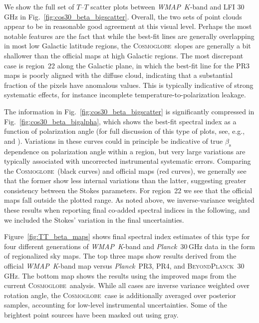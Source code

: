 \documentclass[twocolumn]{../../common/aa}
\def\WMAP{\emph{WMAP}}
\def\Planck{\emph{Planck}}
\newcommand{\bp}{\textsc{BeyondPlanck}}
\newcommand{\cosmoglobe}{\textsc{Cosmoglobe}}
\newcommand{\K}[0]{\textit K}
\begin{document}
We show the full set of $T$--$T$ scatter plots between \WMAP\ $K$-band and LFI 30\,GHz in Fig.~\ref{fig:cos30_beta_bigscatter}. Overall, the two sets of point clouds appear to be in reasonable good agreement at this visual level. Perhaps the most notable features are the fact that while the best-fit lines are generally overlapping in most low Galactic latitude regions, the \cosmoglobe\ slopes are generally a bit shallower than the official maps at high Galactic regions. The most discrepant case is region~22 along the Galactic plane, in which the best-fit line for the PR3 maps is poorly aligned with the diffuse cloud, indicating that a substantial fraction of the pixels have anomalous values. This is typically indicative of strong systematic effects, for instance incomplete temperature-to-polarization leakage.

The information in Fig.~\ref{fig:cos30_beta_bigscatter} is significantly compressed in Fig.~\ref{fig:cos30_beta_bigalpha}, which shows the best-fit spectral index as a function of polarization angle (for full discussion of this type of plots, see, e.g., \citealt{wehus:2013} and \citealt{fuskeland:2019}). Variations in these curves could in principle be indicative of true $\beta_\mathrm s$ dependence on polarization angle within a region, but very large variations are typically associated with uncorrected instrumental systematic errors. Comparing the \cosmoglobe\ (black curves) and official maps (red curves), we generally see that the former show less internal variations than the latter, suggesting greater consistency between the Stokes parameters. For region~22 we see that the official maps fall outside the plotted range. As noted above, we inverse-variance weighted these results when reporting final co-added spectral indices in the following, and we included the Stokes' variation in the final uncertainties.

Figure~\ref{fig:TT_beta_maps} shows final spectral index estimates of this type for four different generations of \WMAP\ \K-band and \Planck\ 30\,GHz data in the form of regionalized sky maps. The top three maps show results derived from the official \WMAP\ \K-band map versus \Planck\ PR3, PR4, and \bp\ 30\,GHz. The bottom map shows the results using the improved maps from the current \cosmoglobe\ analysis. While all cases are inverse variance weighted over rotation angle, the \cosmoglobe\ case is additionally averaged over posterior samples, accounting for low-level instrumental uncertainties. Some of the brightest point sources have been masked out using gray.
\end{document}
